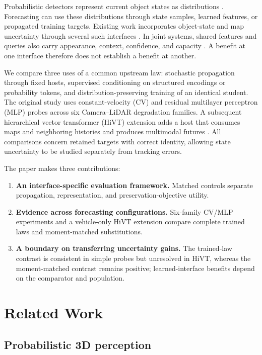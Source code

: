 \documentclass[lettersize,journal]{IEEEtran}
\begin{document}
Probabilistic detectors represent current object states as distributions \cite{ref8,ref9}. Forecasting can use these distributions through state samples, learned features, or propagated training targets. Existing work incorporates object-state and map uncertainty through several such interfaces \cite{ref10,ref11,ref12,ref13,ref14,ref15,ref16,ref17}. In joint systems, shared features and queries also carry appearance, context, confidence, and capacity \cite{ref18,ref19,ref20,ref21,ref22}. A benefit at one interface therefore does not establish a benefit at another.

We compare three uses of a common upstream law: stochastic propagation through fixed hosts, supervised conditioning on structured encodings or probability tokens, and distribution-preserving training of an identical student. The original study uses constant-velocity (CV) and residual multilayer perceptron (MLP) probes across six Camera--LiDAR degradation families. A subsequent hierarchical vector transformer (HiVT) extension adds a host that consumes maps and neighboring histories and produces multimodal futures \cite{ref23}. All comparisons concern retained targets with correct identity, allowing state uncertainty to be studied separately from tracking errors.

The paper makes three contributions:

\begin{enumerate}
  \item \textbf{An interface-specific evaluation framework.} Matched controls separate propagation, representation, and preservation-objective utility.
  \item \textbf{Evidence across forecasting configurations.} Six-family CV/MLP experiments and a vehicle-only HiVT extension compare complete trained laws and moment-matched substitutions.
  \item \textbf{A boundary on transferring uncertainty gains.} The trained-law contrast is consistent in simple probes but unresolved in HiVT, whereas the moment-matched contrast remains positive; learned-interface benefits depend on the comparator and population.
\end{enumerate}

\section{Related Work}
\label{sec:section2}

\subsection{Probabilistic 3D perception}
\label{subsec:section2-1}
\end{document}
